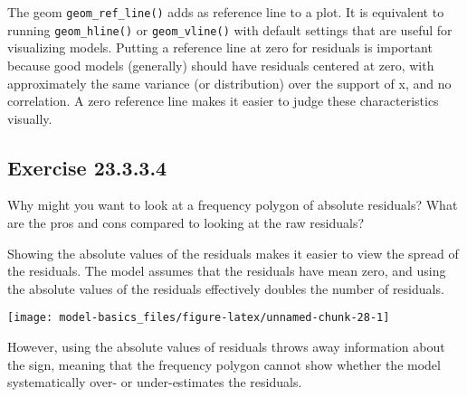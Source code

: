 \documentclass[]{book}
\newenvironment{Shaded}{\begin{snugshade}}{\end{snugshade}}
\newcommand{\DataTypeTok}[1]{\textcolor[rgb]{0.13,0.29,0.53}{#1}}
\newcommand{\FloatTok}[1]{\textcolor[rgb]{0.00,0.00,0.81}{#1}}
\newcommand{\KeywordTok}[1]{\textcolor[rgb]{0.13,0.29,0.53}{\textbf{#1}}}
\newcommand{\NormalTok}[1]{#1}
\newcommand{\OperatorTok}[1]{\textcolor[rgb]{0.81,0.36,0.00}{\textbf{#1}}}
\newcommand{\StringTok}[1]{\textcolor[rgb]{0.31,0.60,0.02}{#1}}
\theoremstyle{plain}
\theoremstyle{remark}
\begin{document}
The geom \texttt{geom\_ref\_line()} adds as reference line to a plot. It
is equivalent to running \texttt{geom\_hline()} or
\texttt{geom\_vline()} with default settings that are useful for
visualizing models. Putting a reference line at zero for residuals is
important because good models (generally) should have residuals centered
at zero, with approximately the same variance (or distribution) over the
support of x, and no correlation. A zero reference line makes it easier
to judge these characteristics visually.

\hypertarget{exercise-23.3.3.4}{%
\subsection*{\texorpdfstring{Exercise
{23.3.3.4}}{Exercise 23.3.3.4}}\label{exercise-23.3.3.4}}

Why might you want to look at a frequency polygon of absolute residuals?
What are the pros and cons compared to looking at the raw residuals?

Showing the absolute values of the residuals makes it easier to view the
spread of the residuals. The model assumes that the residuals have mean
zero, and using the absolute values of the residuals effectively doubles
the number of residuals.

\begin{Shaded}
\end{Shaded}

\begin{center}\texttt{[image: model-basics\_files/figure-latex/unnamed-chunk-28-1]} \end{center}

However, using the absolute values of residuals throws away information
about the sign, meaning that the frequency polygon cannot show whether
the model systematically over- or under-estimates the residuals.
\end{document}

